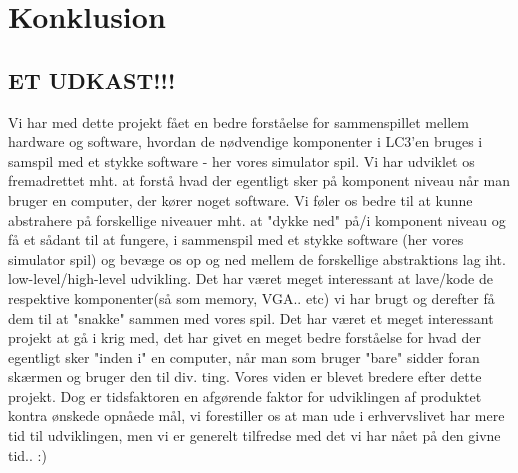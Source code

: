 \chapter{Konklusion}\label{cha:konklusion}
\section{ET UDKAST!!!}
Vi har med dette projekt fået en bedre forståelse for sammenspillet mellem hardware og software, hvordan de nødvendige komponenter i LC3'en bruges i samspil med et stykke software - her vores simulator spil. Vi har udviklet os fremadrettet mht. at forstå hvad der egentligt sker på komponent niveau når man bruger en computer, der kører noget software. Vi føler os bedre til at kunne abstrahere på forskellige niveauer mht. at "dykke ned" på/i komponent niveau og få et sådant til at fungere, i sammenspil med et stykke software (her vores simulator spil) og bevæge os op og ned mellem de forskellige abstraktions lag iht. low-level/high-level udvikling. Det har været meget interessant at lave/kode de respektive komponenter(så som memory, VGA.. etc) vi har brugt og derefter få dem til at "snakke" sammen med vores spil.
Det har været et meget interessant projekt at gå i krig med, det har givet en meget bedre forståelse for hvad der egentligt sker "inden i" en computer, når man som bruger "bare" sidder foran skærmen og bruger den til div. ting. Vores viden er blevet bredere efter dette projekt.
Dog er tidsfaktoren en afgørende faktor for udviklingen af produktet kontra ønskede opnåede mål, vi forestiller os at man ude i erhvervslivet har mere tid til udviklingen, men vi er generelt tilfredse med det vi har nået på den givne tid.. :) 